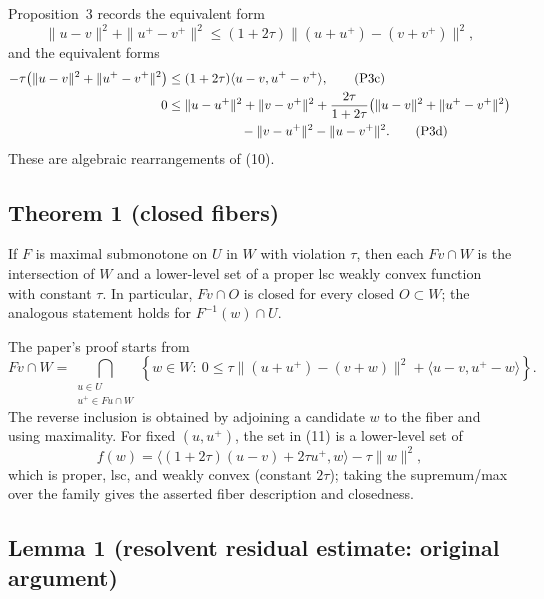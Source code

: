 \documentclass[11pt]{article}
\begin{document}
Proposition~3 records the equivalent form
\begin{equation}
 \|u-v\|^2+\|u^+-v^+\|^2
 \le(1+2\tau)\|(u+u^+)-(v+v^+)\|^2,                  \tag{P3b}
\end{equation}
and the equivalent forms
\begin{align}
 -\tau\bigl(\|u-v\|^2+\|u^+-v^+\|^2\bigr)
 &\le(1+2\tau)\langle u-v,u^+-v^+\rangle,             \tag{P3c}\\
 0&\le\|u-u^+\|^2+\|v-v^+\|^2
 +\frac{2\tau}{1+2\tau}\bigl(\|u-v\|^2+\|u^+-v^+\|^2\bigr)\notag\\
 &\hspace{2cm}-\|v-u^+\|^2-\|u-v^+\|^2.                \tag{P3d}
\end{align}
These are algebraic rearrangements of (10).

\subsection*{Theorem 1 (closed fibers)}

If \(F\) is maximal submonotone on \(U\) in \(W\) with violation \(\tau\), then each \(Fv\cap W\) is the intersection of \(W\) and a lower-level set of a proper lsc weakly convex function with constant \(\tau\). In particular, \(Fv\cap O\) is closed for every closed \(O\subset W\); the analogous statement holds for \(F^{-1}(w)\cap U\).

The paper's proof starts from
\begin{equation}
Fv\cap W=
\bigcap_{\substack{u\in U\\u^+\in Fu\cap W}}
\left\{w\in W:\ 0\le \tau\|(u+u^+)-(v+w)\|^2
 +\langle u-v,u^+-w\rangle\right\}.                 \tag{11}
\end{equation}
The reverse inclusion is obtained by adjoining a candidate \(w\) to the fiber and using maximality. For fixed \((u,u^+)\), the set in (11) is a lower-level set of
\[
 f(w)=\langle(1+2\tau)(u-v)+2\tau u^+,w\rangle-\tau\|w\|^2,
\]
which is proper, lsc, and weakly convex (constant \(2\tau\)); taking the supremum/max over the family gives the asserted fiber description and closedness.

\subsection*{Lemma 1 (resolvent residual estimate: original argument)}
\end{document}
